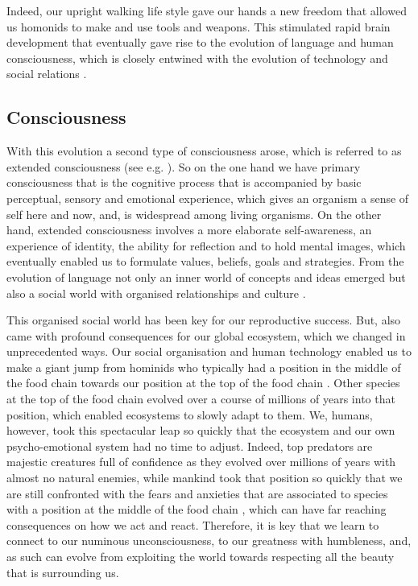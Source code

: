 \documentclass[
  11pt,
]{book}
\begin{document}
Indeed, our upright walking life style gave our hands a new freedom that allowed us homonids to make and use tools and weapons. This stimulated rapid brain development that eventually gave rise to the evolution of language and human consciousness, which is closely entwined with the evolution of technology and social relations \citep{capraLuisi2014}.

\hypertarget{consciousness}{%
\subsection{Consciousness}\label{consciousness}}

With this evolution a second type of consciousness arose, which is referred to as extended consciousness (see e.g. \citet{capraLuisi2014}). So on the one hand we have primary consciousness that is the cognitive process that is accompanied by basic perceptual, sensory and emotional experience, which gives an organism a sense of self here and now, and, is widespread among living organisms. On the other hand, extended consciousness involves a more elaborate self-awareness, an experience of identity, the ability for reflection and to hold mental images, which eventually enabled us to formulate values, beliefs, goals and strategies. From the evolution of language not only an inner world of concepts and ideas emerged but also a social world with organised relationships and culture \citep{capraLuisi2014}.

This organised social world has been key for our reproductive success. But, also came with profound consequences for our global ecosystem, which we changed in unprecedented ways. Our social organisation and human technology enabled us to make a giant jump from hominids who typically had a position in the middle of the food chain towards our position at the top of the food chain \citep{Harari2015}. Other species at the top of the food chain evolved over a course of millions of years into that position, which enabled ecosystems to slowly adapt to them. We, humans, however, took this spectacular leap so quickly that the ecosystem and our own psycho-emotional system had no time to adjust. Indeed, top predators are majestic creatures full of confidence as they evolved over millions of years with almost no natural enemies, while mankind took that position so quickly that we are still confronted with the fears and anxieties that are associated to species with a position at the middle of the food chain \citep{Harari2015}, which can have far reaching consequences on how we act and react. Therefore, it is key that we learn to connect to our numinous unconsciousness, to our greatness with humbleness, and, as such can evolve from exploiting the world towards respecting all the beauty that is surrounding us.
\end{document}
